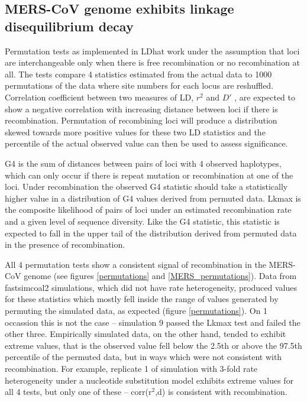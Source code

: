 \documentclass[11pt,oneside,letterpaper]{article}
\begin{document}
\subsection*{MERS-CoV genome exhibits linkage disequilibrium decay}
Permutation tests as implemented in LDhat work under the assumption that loci are interchangeable only when there is free recombination or no recombination at all.
The tests compare 4 statistics estimated from the actual data to 1000 permutations of the data where site numbers for each locus are reshuffled.
Correlation coefficient between two measures of LD, $r^{2}$ \citep{hill_1968} and $D'$ \citep{lewontin_1964}, are expected to show a negative correlation with increasing distance between loci if there is recombination.
Permutation of recombining loci will produce a distribution skewed towards more positive values for these two LD statistics and the percentile of the actual observed value can then be used to assess significance.

G4 is the sum of distances between pairs of loci with 4 observed haplotypes, which can only occur if there is repeat mutation or recombination at one of the loci.
Under recombination the observed G4 statistic should take a statistically higher value in a distribution of G4 values derived from permuted data.
Lkmax is the composite likelihood of pairs of loci under an estimated recombination rate and a given level of sequence diversity.
Like the G4 statistic, this statistic is expected to fall in the upper tail of the distribution derived from permuted data in the presence of recombination.

All 4 permutation tests show a consistent signal of recombination in the MERS-CoV genome (see figures \ref{permutations} and \ref{MERS_permutations}).
Data from fastsimcoal2 simulations, which did not have rate heterogeneity, produced values for these statistics which mostly fell inside the range of values generated by permuting the simulated data, as expected (figure \ref{permutations}).
On 1 occassion this is not the case -- simulation 9 passed the Lkmax test and failed the other three.
Empirically simulated data, on the other hand, tended to exhibit extreme values, that is the observed value fell below the 2.5th or above the 97.5th percentile of the permuted data, but in ways which were not consistent with recombination.
For example, replicate 1 of simulation with 3-fold rate heterogeneity under a nucleotide substitution model exhibits extreme values for all 4 tests, but only one of these -- corr(r$^{2}$,d) is consistent with recombination.
\end{document}
